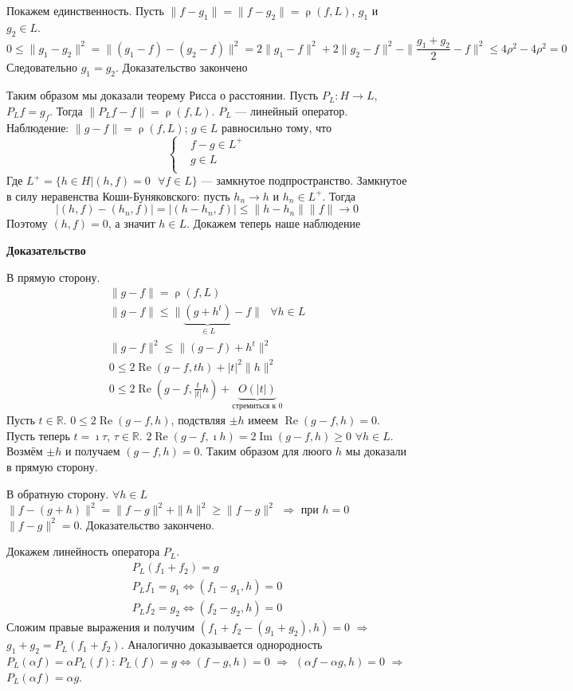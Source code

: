 \documentclass[12pt]{article}
\DeclareMathOperator{\rh}{\rho}
\DeclareMathOperator{\Ree}{Re}
\DeclareMathOperator{\Imm}{Im}
\begin{document}
Покажем единственность. Пусть $\|f-g_1\|=\|f-g_2\|=\rh(f,L)$, $g_1$ и $g_2\in L$.
$$
0\le\|g_1-g_2\|^2=\|(g_1-f)-(g_2-f)\|^2=2\|g_1-f\|^2+2\|g_2-f\|^2-\|\frac{g_1+g_2}2-f\|^2\le4\rho^2-4\rho^2=0
$$
Следовательно $g_1=g_2$. Доказательство закончено

Таким образом мы доказали теорему Рисса о расстоянии.
Пусть $P_L:H\to L$, $P_L f=g_f$.
Тогда $\|P_Lf-f\|=\rh(f,L)$. $P_L$ --- линейный оператор.
Наблюдение: $\|g-f\|=\rh(f,L)$; $g\in L$ равносильно тому, что 
$$
\left\{
\begin{aligned}
&f-g\in L^{+}\\
&g\in L\\
\end{aligned}
\right.
$$
Где $L^+=\{h\in H|(h,f)=0\text{ }\forall f\in L\}$ --- замкнутое подпространство.
Замкнутое в силу неравенства Коши-Буняковского: пусть $h_n\to h$ и $h_n\in L^+$. Тогда
$$
|(h,f)-(h_n,f)|=|(h-h_n,f)|\le\|h-h_n\|\|f\|\to 0
$$
Поэтому $(h,f)=0$, а значит $h\in L$.
Докажем теперь наше наблюдение

\textbf{Доказательство}

В прямую сторону.
\begin{gather*}
\|g-f\|=\rh(f,L)\\
\|g-f\|\le\|\underbrace{(g+h^t)}_{\in L}-f\|\text{ }\forall h\in L\\
\|g-f\|^2\le\|(g-f)+h^t\|^2\\
0\le2\Ree(g-f,th)+|t|^2\|h\|^2\\
0\le2\Ree(g-f,\frac{t}{|t|}h)+\underbrace{O(|t|)}_{\text{стремиться к 0}}
\end{gather*}
Пусть $t\in\mathbb R$.
$0\le2\Ree(g-f,h)$, подствляя $\pm h$ имеем $\Ree(g-f, h)=0$.
Пусть теперь $t=\imath \tau$, $\tau \in \mathbb R$.
$2\Ree(g-f,\imath h)=2\Imm(g-f,h)\ge0$ $\forall h\in L$.
Возмём $\pm h$ и получаем $(g-f,h)=0$. Таким образом для люого $h$ мы доказали в прямую сторону.

В обратную сторону.
$\forall h\in L$ $\|f-(g+h)\|^2=\|f-g\|^2+\|h\|^2\ge\|f-g\|^2$ $\Rightarrow$ при $h=0$ $\|f-g\|^2=0$.
Доказательство закончено.

Докажем линейность оператора $P_L$.
\begin{gather*}
P_L(f_1+f_2)=g\\
P_Lf_1=g_1\Leftrightarrow(f_1-g_1,h)=0\\
P_Lf_2=g_2\Leftrightarrow(f_2-g_2,h)=0
\end{gather*}
Сложим правые выражения и получим $(f_1+f_2-(g_1+g_2),h)=0$ $\Rightarrow$ $g_1+g_2=P_L(f_1+f_2)$.
Аналогично доказывается однородность $P_L(\alpha f)=\alpha P_L(f)$: $P_L(f)=g\Leftrightarrow(f-g,h)=0$ $\Rightarrow$ $(\alpha f- \alpha g,h)=0$ $\Rightarrow$ $P_L(\alpha f)=\alpha g$.
\end{document}
